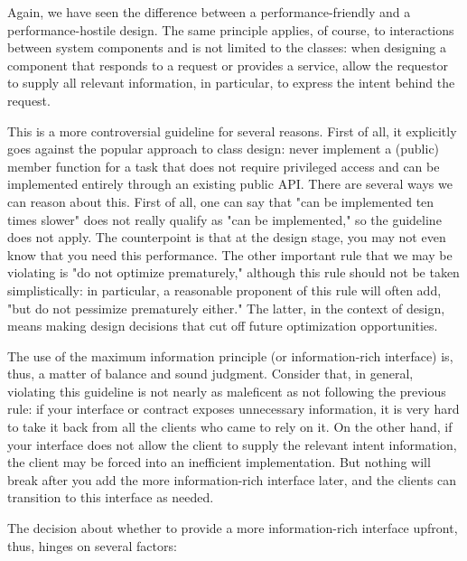 Again, we have seen the difference between a performance-friendly and a performance-hostile design. The same principle applies, of course, to interactions between system components and is not limited to the classes: when designing a component that responds to a request or provides a service, allow the requestor to supply all relevant information, in particular, to express the intent behind the request.

This is a more controversial guideline for several reasons. First of all, it explicitly goes against the popular approach to class design: never implement a (public) member function for a task that does not require privileged access and can be implemented entirely through an existing public API. There are several ways we can reason about this. First of all, one can say that "can be implemented ten times slower" does not really qualify as "can be implemented," so the guideline does not apply. The counterpoint is that at the design stage, you may not even know that you need this performance. The other important rule that we may be violating is "do not optimize prematurely," although this rule should not be taken simplistically: in particular, a reasonable proponent of this rule will often add, "but do not pessimize prematurely either." The latter, in the context of design, means making design decisions that cut off future optimization opportunities. 

The use of the maximum information principle (or information-rich interface) is, thus, a matter of balance and sound judgment. Consider that, in general, violating this guideline is not nearly as maleficent as not following the previous rule: if your interface or contract exposes unnecessary information, it is very hard to take it back from all the clients who came to rely on it. On the other hand, if your interface does not allow the client to supply the relevant intent information, the client may be forced into an inefficient implementation. But nothing will break after you add the more information-rich interface later, and the clients can transition to this interface as needed.

The decision about whether to provide a more information-rich interface upfront, thus, hinges on several factors: 

